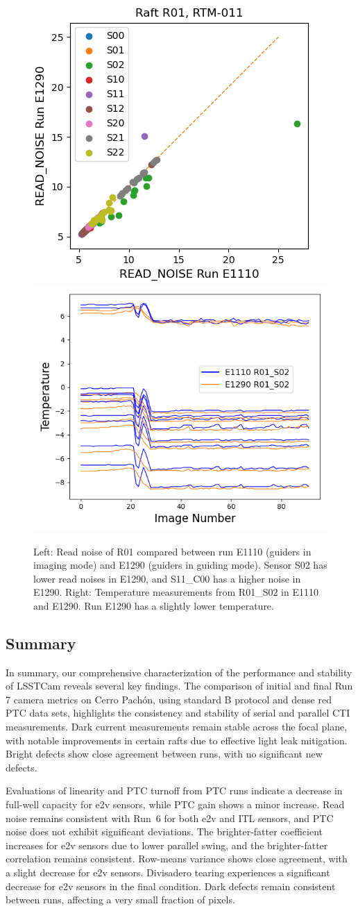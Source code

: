 \begin{figure}[ht]
    \centering
    \includegraphics[width=0.4\linewidth]{figures/E1110_E1290_READ_NOISE_outliers.png}
    \includegraphics[width=0.47\linewidth]{figures/temperature_E1110_E1290.png}
    \caption{Left: Read noise of R01 compared between run E1110 (guiders in imaging mode) and E1290 (guiders in guiding mode). Sensor S02 has lower read noises in E1290, and S11\_C00 has a higher noise in E1290. Right: Temperature measurements from R01\_S02 in E1110 and E1290. Run E1290 has a slightly lower temperature.}
    \label{fig:guider_noise_outliers}
\end{figure}

\clearpage
\subsection{Summary}

In summary, our comprehensive characterization of the  performance and stability of LSSTCam reveals several key findings. The comparison of initial and final Run 7 camera metrics on Cerro Pachón, using standard B protocol and dense red PTC data sets, highlights the consistency and stability of serial and parallel CTI measurements. Dark current measurements remain stable across the focal plane, with notable improvements in certain rafts due to effective light leak mitigation. Bright defects show close agreement between runs, with no significant new defects.

Evaluations of linearity and PTC turnoff from PTC runs indicate a decrease in full-well capacity for e2v sensors, while PTC gain shows a minor increase. Read noise remains consistent with Run~6 for both e2v and ITL sensors, and PTC noise does not exhibit significant deviations. The brighter-fatter coefficient increases for e2v sensors due to lower parallel swing, and the brighter-fatter correlation remains consistent. Row-means variance shows close agreement, with a slight decrease for e2v sensors. Divisadero tearing experiences a significant decrease for e2v sensors in the final condition. Dark defects remain consistent between runs, affecting a very small fraction of pixels.

